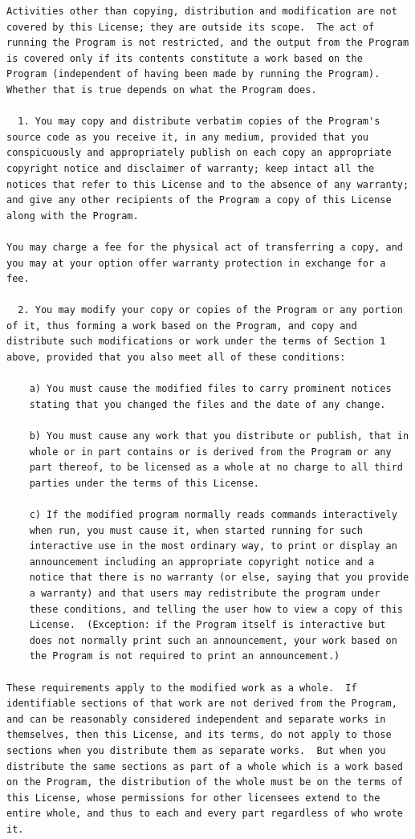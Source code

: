 \documentclass[mingoth,a4paper]{jsarticle}
\begin{document}
{\begin{multicols}{2}
\begin{fontsize}{6}{6}
\begin{verbatim}
Activities other than copying, distribution and modification are not
covered by this License; they are outside its scope.  The act of
running the Program is not restricted, and the output from the Program
is covered only if its contents constitute a work based on the
Program (independent of having been made by running the Program).
Whether that is true depends on what the Program does.

  1. You may copy and distribute verbatim copies of the Program's
source code as you receive it, in any medium, provided that you
conspicuously and appropriately publish on each copy an appropriate
copyright notice and disclaimer of warranty; keep intact all the
notices that refer to this License and to the absence of any warranty;
and give any other recipients of the Program a copy of this License
along with the Program.

You may charge a fee for the physical act of transferring a copy, and
you may at your option offer warranty protection in exchange for a fee.

  2. You may modify your copy or copies of the Program or any portion
of it, thus forming a work based on the Program, and copy and
distribute such modifications or work under the terms of Section 1
above, provided that you also meet all of these conditions:

    a) You must cause the modified files to carry prominent notices
    stating that you changed the files and the date of any change.

    b) You must cause any work that you distribute or publish, that in
    whole or in part contains or is derived from the Program or any
    part thereof, to be licensed as a whole at no charge to all third
    parties under the terms of this License.

    c) If the modified program normally reads commands interactively
    when run, you must cause it, when started running for such
    interactive use in the most ordinary way, to print or display an
    announcement including an appropriate copyright notice and a
    notice that there is no warranty (or else, saying that you provide
    a warranty) and that users may redistribute the program under
    these conditions, and telling the user how to view a copy of this
    License.  (Exception: if the Program itself is interactive but
    does not normally print such an announcement, your work based on
    the Program is not required to print an announcement.)

These requirements apply to the modified work as a whole.  If
identifiable sections of that work are not derived from the Program,
and can be reasonably considered independent and separate works in
themselves, then this License, and its terms, do not apply to those
sections when you distribute them as separate works.  But when you
distribute the same sections as part of a whole which is a work based
on the Program, the distribution of the whole must be on the terms of
this License, whose permissions for other licensees extend to the
entire whole, and thus to each and every part regardless of who wrote it.


\end{verbatim}
\end{fontsize}
\end{multicols}}
\end{document}
